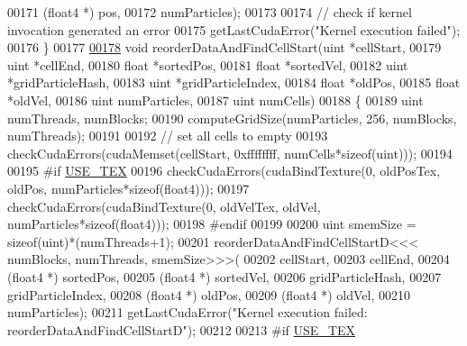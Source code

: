 \begin{DoxyCode}
00171                                                (float4 *) pos,
00172                                                numParticles);
00173 
00174         \textcolor{comment}{// check if kernel invocation generated an error}
00175         getLastCudaError(\textcolor{stringliteral}{"Kernel execution failed"});
00176     \}
00177 
\hypertarget{particle_system__cuda_8cu_source_l00178}{}\hyperlink{particle_system__cuda_8cu_ac72ccd068434c46c2f901c751d53be1d}{00178}     \textcolor{keywordtype}{void} reorderDataAndFindCellStart(uint  *cellStart,
00179                                      uint  *cellEnd,
00180                                      \textcolor{keywordtype}{float} *sortedPos,
00181                                      \textcolor{keywordtype}{float} *sortedVel,
00182                                      uint  *gridParticleHash,
00183                                      uint  *gridParticleIndex,
00184                                      \textcolor{keywordtype}{float} *oldPos,
00185                                      \textcolor{keywordtype}{float} *oldVel,
00186                                      uint   numParticles,
00187                                      uint   numCells)
00188     \{
00189         uint numThreads, numBlocks;
00190         computeGridSize(numParticles, 256, numBlocks, numThreads);
00191 
00192         \textcolor{comment}{// set all cells to empty}
00193         checkCudaErrors(cudaMemset(cellStart, 0xffffffff, numCells*\textcolor{keyword}{sizeof}(uint)));
00194 
00195 \textcolor{preprocessor}{#}\textcolor{preprocessor}{if} \hyperlink{particles__kernel_8cuh_a0ab211ca35e2616c721fcf2dd4f99c83}{USE\_TEX}
00196         checkCudaErrors(cudaBindTexture(0, oldPosTex, oldPos, numParticles*\textcolor{keyword}{sizeof}(float4)));
00197         checkCudaErrors(cudaBindTexture(0, oldVelTex, oldVel, numParticles*\textcolor{keyword}{sizeof}(float4)));
00198 \textcolor{preprocessor}{#}\textcolor{preprocessor}{endif}
00199 
00200         uint smemSize = \textcolor{keyword}{sizeof}(uint)*(numThreads+1);
00201         reorderDataAndFindCellStartD<<< numBlocks, numThreads, smemSize>>>(
00202             cellStart,
00203             cellEnd,
00204             (float4 *) sortedPos,
00205             (float4 *) sortedVel,
00206             gridParticleHash,
00207             gridParticleIndex,
00208             (float4 *) oldPos,
00209             (float4 *) oldVel,
00210             numParticles);
00211         getLastCudaError(\textcolor{stringliteral}{"Kernel execution failed: reorderDataAndFindCellStartD"});
00212 
00213 \textcolor{preprocessor}{#}\textcolor{preprocessor}{if} \hyperlink{particles__kernel_8cuh_a0ab211ca35e2616c721fcf2dd4f99c83}{USE\_TEX}

\end{DoxyCode}
